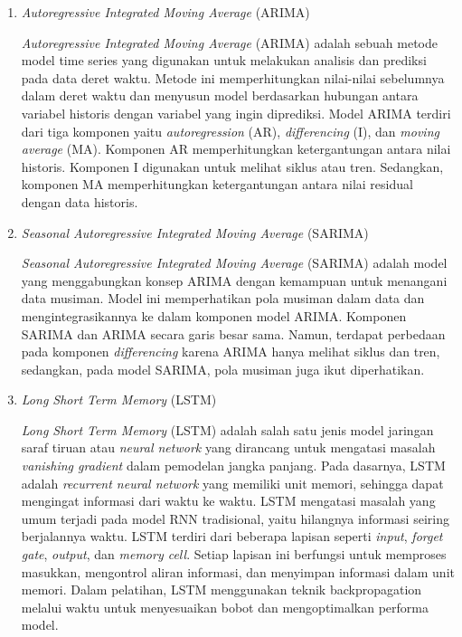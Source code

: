 \begin{enumerate}
    \item \textit{Autoregressive Integrated Moving Average} (ARIMA)
    
    \textit{Autoregressive Integrated Moving Average} (ARIMA) adalah sebuah metode model time series yang digunakan untuk melakukan analisis dan prediksi pada data deret waktu. Metode ini memperhitungkan nilai-nilai sebelumnya dalam deret waktu dan menyusun model berdasarkan hubungan antara variabel historis dengan variabel yang ingin diprediksi. Model ARIMA terdiri dari tiga komponen yaitu \textit{autoregression} (AR), \textit{differencing} (I), dan \textit{moving average} (MA). Komponen AR memperhitungkan ketergantungan antara nilai historis. Komponen I digunakan untuk melihat siklus atau tren. Sedangkan, komponen MA memperhitungkan ketergantungan antara nilai residual dengan data historis.

    \item \textit{Seasonal Autoregressive Integrated Moving Average} (SARIMA)
    
    \textit{Seasonal Autoregressive Integrated Moving Average} (SARIMA) adalah model yang menggabungkan konsep ARIMA dengan kemampuan untuk menangani data musiman. Model ini memperhatikan pola musiman dalam data dan mengintegrasikannya ke dalam komponen model ARIMA. Komponen SARIMA dan ARIMA secara garis besar sama. Namun, terdapat perbedaan pada komponen \textit{differencing} karena ARIMA hanya melihat siklus dan tren, sedangkan, pada model SARIMA, pola musiman juga ikut diperhatikan.

    \item \textit{Long Short Term Memory} (LSTM)
    
    \textit{Long Short Term Memory} (LSTM) adalah salah satu jenis model jaringan saraf tiruan atau \textit{neural network} yang dirancang untuk mengatasi masalah \textit{vanishing gradient} dalam pemodelan jangka panjang. Pada dasarnya, LSTM adalah \textit{recurrent neural network} yang memiliki unit memori, sehingga dapat mengingat informasi dari waktu ke waktu. LSTM mengatasi masalah yang umum terjadi pada model RNN tradisional, yaitu hilangnya informasi seiring berjalannya waktu. LSTM terdiri dari beberapa lapisan seperti \textit{input}, \textit{forget gate}, \textit{output}, dan \textit{memory cell}. Setiap lapisan ini berfungsi untuk memproses masukkan, mengontrol aliran informasi, dan menyimpan informasi dalam unit memori. Dalam pelatihan, LSTM menggunakan teknik backpropagation melalui waktu untuk menyesuaikan bobot dan mengoptimalkan performa model. 

\end{enumerate}

